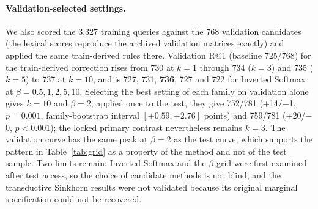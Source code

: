 \paragraph{Validation-selected settings.} We also scored the 3,327 training queries against the 768 validation candidates (the lexical scores reproduce the archived validation matrices exactly) and applied the same train-derived rules there. Validation R@1 (baseline 725/768) for the train-derived correction rises from 730 at $k=1$ through 734 ($k=3$) and 735 ($k=5$) to 737 at $k=10$, and is 727, 731, \textbf{736}, 727 and 722 for Inverted Softmax at $\beta=0.5,1,2,5,10$. Selecting the best setting of each family on validation alone gives $k=10$ and $\beta=2$; applied once to the test, they give 752/781 (+14/$-$1, $p=0.001$, family-bootstrap interval $[+0.59,+2.76]$ points) and 759/781 (+20/$-$0, $p<0.001$); the locked primary contrast nevertheless remains $k=3$. The validation curve has the same peak at $\beta=2$ as the test curve, which supports the pattern in Table~\ref{tab:grid} as a property of the method and not of the test sample. Two limits remain: Inverted Softmax and the $\beta$ grid were first examined after test access, so the choice of candidate methods is not blind, and the transductive Sinkhorn results were not validated because its original marginal specification could not be recovered.
